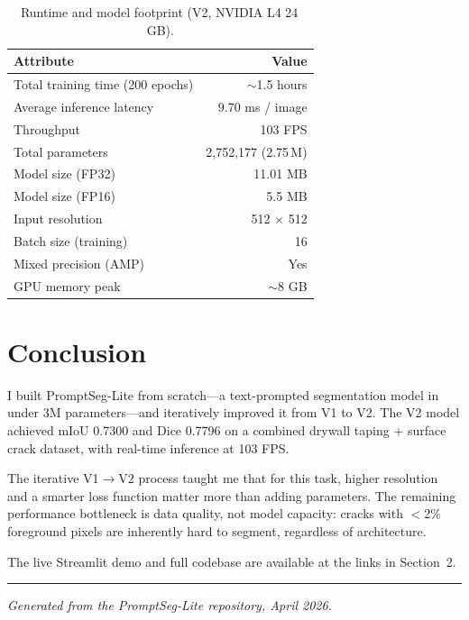 \documentclass[12pt,a4paper]{article}
\begin{document}
\begin{table}[H]
\centering
\caption{Runtime and model footprint (V2, NVIDIA L4 24\,GB).}
\begin{tabular}{lr}
\toprule
\textbf{Attribute} & \textbf{Value} \\
\midrule
Total training time (200 epochs) & $\sim$1.5 hours \\
Average inference latency        & 9.70 ms / image \\
Throughput                       & 103 FPS \\
Total parameters                 & 2,752,177 (2.75\,M) \\
Model size (FP32)                & 11.01 MB \\
Model size (FP16)                & 5.5 MB \\
Input resolution                 & 512 $\times$ 512 \\
Batch size (training)            & 16 \\
Mixed precision (AMP)            & Yes \\
GPU memory peak                  & $\sim$8 GB \\
\bottomrule
\end{tabular}
\end{table}

\section{Conclusion}

I built PromptSeg-Lite from scratch---a text-prompted segmentation model in under 3M parameters---and iteratively improved it from V1 to V2.  The V2 model achieved mIoU 0.7300 and Dice 0.7796 on a combined drywall taping + surface crack dataset, with real-time inference at 103 FPS.

The iterative V1$\to$V2 process taught me that for this task, higher resolution and a smarter loss function matter more than adding parameters.  The remaining performance bottleneck is data quality, not model capacity: cracks with $<$2\% foreground pixels are inherently hard to segment, regardless of architecture.

The live Streamlit demo and full codebase are available at the links in Section~2.

\vfill
\hrule
\vspace{0.5em}
\small\textit{Generated from the PromptSeg-Lite repository, April 2026.}
\end{document}
